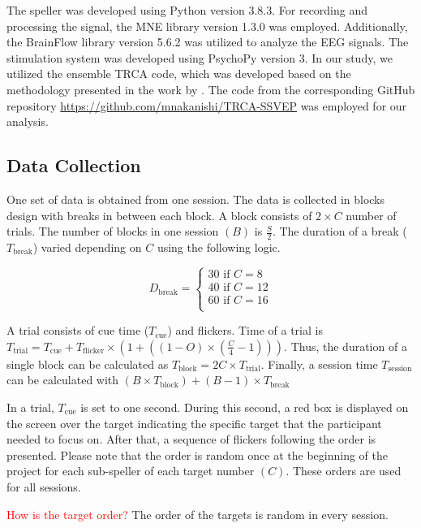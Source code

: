 The speller was developed using Python version 3.8.3. For recording and processing the signal, the MNE library version 1.3.0 was employed. 
Additionally, the BrainFlow library version 5.6.2 was utilized to analyze the EEG signals. 
The stimulation system was developed using PsychoPy version 3. 
In our study, we utilized the ensemble TRCA code, which was developed based on the methodology presented in the work by \cite{nakanishi2017enhancing}.
The code from the corresponding GitHub repository \url{https://github.com/mnakanishi/TRCA-SSVEP} was employed for our analysis.

\subsection{Data Collection}
\label{metho:data-collection}

One set of data is obtained from one session.
The data is collected in blocks design with breaks in between each block.
A block consists of $2 \times C$ number of trials. 
The number of blocks in one session \((B)\) is $\frac{S}{2}$. 
The duration of a break ($T_{\text{break}}$) varied depending on $C$ using the following logic.

\[ D_{\text{break}}=\begin{cases}
    30 \text{ if } C = 8 \\
    40 \text{ if } C = 12 \\
    60 \text{ if } C = 16 \\
\end{cases}\]

A trial consists of cue time ($T_\text{cue}$) and flickers. 
Time of a trial is \( T_\text{trial} = T_\text{cue} + T_\text{flicker} \times ( 1 + ((1 - O) \times (\frac{C}{4} - 1)) ) \). 
Thus, the duration of a single block can be calculated as \( T_{\text{block}} = 2C \times T_\text{trial} \).
Finally, a session time \( T_\text{session} \) can be calculated with \( (B \times T_\text{block}) + (B - 1) \times T_\text{break} \)

In a trial, \(T_\text{cue}\) is set to one second. 
During this second, a red box is displayed on the screen over the target indicating the specific target that the participant needed to focus on.
After that, a sequence of flickers following the order is presented.
Please note that the order is random once at the beginning of the project for each sub-speller of each target number \((C)\). 
These orders are used for all sessions.

\textcolor{red}{How is the target order?}
The order of the targets is random in every session.

